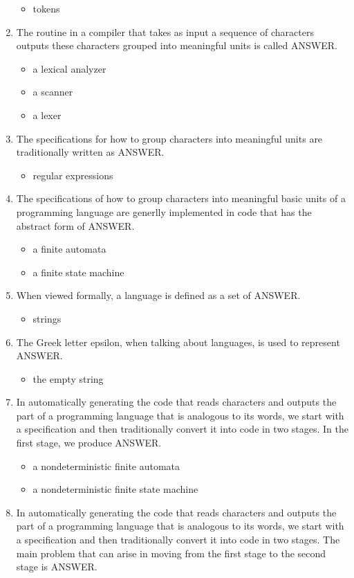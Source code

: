 \documentclass{exam}
\begin{document}
\begin{enumerate}
\begin{itemize}
\item tokens
\end{itemize}
\item The routine in a compiler that takes as input a sequence of characters outputs these characters grouped into meaningful units is called ANSWER.
\begin{itemize}
\item a lexical analyzer
\item a scanner
\item a lexer
\end{itemize}
\item The specifications for how to group characters into meaningful units are traditionally written as ANSWER.
\begin{itemize}
\item regular expressions
\end{itemize}
\item The specifications of how to group characters into meaningful basic units of a programming language are generlly implemented in code that has the abstract form of ANSWER.
\begin{itemize}
\item a finite automata
\item a finite state machine
\end{itemize}
\item When viewed formally, a language is defined as a set of ANSWER.
\begin{itemize}
\item strings
\end{itemize}
\item The Greek letter epsilon, when talking about languages, is used to represent ANSWER.
\begin{itemize}
\item the empty string
\end{itemize}
\item In automatically generating the code that reads characters and outputs the part of a programming language that is analogous to its words, we start with a specification and then traditionally convert it into code in two stages.  In the first stage, we produce ANSWER.
\begin{itemize}
\item a nondeterministic finite automata
\item a nondeterministic finite state machine
\end{itemize}
\item In automatically generating the code that reads characters and outputs the part of a programming language that is analogous to its words, we start with a specification and then traditionally convert it into code in two stages.  The main problem that can arise in moving from the first stage to the second stage is ANSWER.

\end{enumerate}
\end{document}
